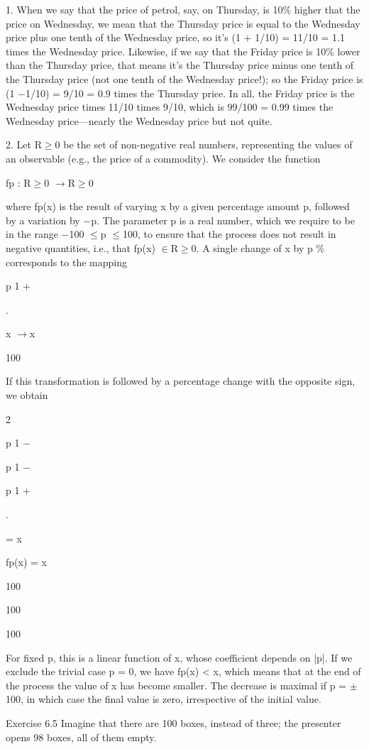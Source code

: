 \documentclass[11pt]{article}
\theoremstyle{plain}
\theoremstyle{definition}
\begin{document}
1. When we say that the price of petrol, say, on Thursday, is 10\% higher that the price on Wednesday, we mean that the Thursday price is equal to the Wednesday price plus one tenth of the Wednesday price, so it's (1 + 1/10) = 11/10 = 1.1 times the Wednesday price. Likewise, if we say that the Friday price is 10\% lower than the Thursday price, that means it's the Thursday price minus one tenth of the Thursday price (not one tenth of the Wednesday price!); so the Friday price is (1 $-$1/10) = 9/10 = 0.9 times the Thursday price. In all, the Friday price is the Wednesday price times 11/10 times 9/10, which is 99/100 = 0.99 times the Wednesday price---nearly the Wednesday price but not quite.

2. Let R$\geq$0 be the set of non-negative real numbers, representing the values of an observable (e.g., the price of a commodity). We consider the function

fp : R$\geq$0 $\to$R$\geq$0

where fp(x) is the result of varying x by a given percentage amount p, followed by a variation by $-$p. The parameter p is a real number, which we require to be in the range $-$100 $\leq$p $\leq$100, to ensure that the process does not result in negative quantities, i.e., that fp(x) $\in$R$\geq$0. A single change of x by p \% corresponds to the mapping

p 1 +

.

x $\to$x

100

If this transformation is followed by a percentage change with the opposite sign, we obtain

2

p 1 $-$

p 1 $-$

p 1 +

.

= x

fp(x) = x

100

100

100

For fixed p, this is a linear function of x, whose coefficient depends on |p|. If we exclude the trivial case p = 0, we have fp(x) < x, which means that at the end of the process the value of x has become smaller. The decrease is maximal if p = $\pm$100, in which case the final value is zero, irrespective of the initial value.

Exercise 6.5 Imagine that there are 100 boxes, instead of three; the presenter opens 98 boxes, all of them empty.
\end{document}
